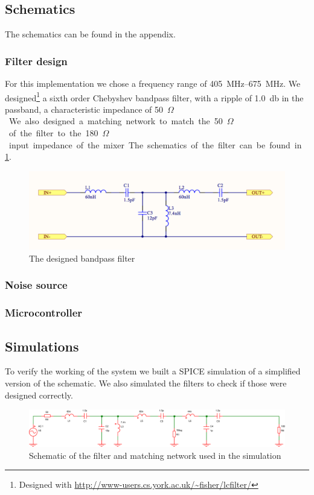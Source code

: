 \documentclass[a4paper, openany, oneside]{memoir}
\begin{document}
\subsection{Schematics}
The schematics can be found in the appendix.


\subsubsection{Filter design}
For this implementation we chose a frequency range of \SIrange{405}{675}{\mega\hertz}. We designed\footnote{Designed with \url{http://www-users.cs.york.ac.uk/~fisher/lcfilter/}} a sixth order Chebyshev bandpass filter, with a ripple of \SI{1.0}{\decibel} in the passband, a characteristic impedance of \SI{50}{$\Omega$}. We also designed a matching network to match the \SI{50}{$\Omega$} of the filter to the \SI{180}{$\Omega$} input impedance of the mixer. The schematics of the filter can be found in \cref{fig:filter}.

\begin{figure}[h]
    \centering
    \includegraphics[width=\textwidth]{filter.png}
    \caption{The designed bandpass filter}
    \label{fig:filter}
\end{figure}

\subsubsection{Noise source}

\subsubsection{Microcontroller}

\subsection{Simulations}
To verify the working of the system we built a SPICE simulation of a simplified version of the schematic. We also simulated the filters to check if those were designed correctly.
\begin{figure}[h]
    \centering
    \includegraphics[width=\textwidth]{sim_schematic.pdf}
    \caption{Schematic of the filter and matching network used in the simulation}
    \label{fig:sim_schematic}
\end{figure}
\end{document}
